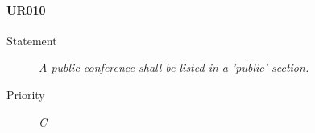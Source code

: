 \paragraph{UR010}
  \begin{description}
  \item [Statement] 
    \textit{ A public conference shall be listed in a 'public' section.}
  \item [Priority] \textit{C}
\end{description}